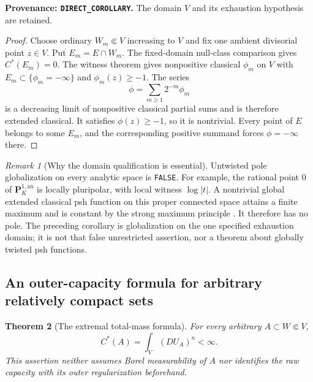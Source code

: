\documentclass[11pt,a4paper]{article}
\numberwithin{equation}{section}
\newtheorem{theorem}{Theorem}[section]
\theoremstyle{definition}
\theoremstyle{remark}
\newtheorem{remark}[theorem]{Remark}
\newcommand{\an}{\mathrm{an}}
\begin{document}
\noindent\textbf{Provenance: \texttt{DIRECT\_COROLLARY}.}
The domain $V$ and its exhaustion hypothesis are retained.

\begin{proof}
Choose ordinary $W_m\Subset V$ increasing to $V$ and fix one
ambient divisorial point $z\in V$. Put $E_m=E\cap W_m$.
The fixed-domain null-class comparison gives $C^*(E_m)=0$.
The witness theorem gives nonpositive classical $\phi_m$ on $V$
with $E_m\subset\{\phi_m=-\infty\}$ and $\phi_m(z)\geq-1$.
The series
\[
 \phi=\sum_{m\geq1}2^{-m}\phi_m
\]
is a decreasing limit of nonpositive classical partial sums and
is therefore extended classical. It satisfies $\phi(z)\geq-1$,
so it is nontrivial. Every point of $E$ belongs to some $E_m$,
and the corresponding positive summand forces $\phi=-\infty$
there.
\end{proof}

\begin{remark}[Why the domain qualification is essential]
Untwisted pole globalization on every analytic space is
\texttt{FALSE}. For example, the rational point $0$ of
$\mathbf P^{1,\an}_K$ is locally pluripolar, with local witness
$\log|t|$. A nontrivial global extended classical psh function
on this proper connected space attains a finite maximum and is
constant by the strong maximum principle
\cite[Theorem 6.1]{GR25}. It therefore has no
pole. The preceding corollary is globalization on the one
specified exhaustion domain; it is not that false unrestricted
assertion, nor a theorem about globally twisted psh functions.
\end{remark}

\subsection{An outer-capacity formula for arbitrary relatively compact sets}

\begin{theorem}[The extremal total-mass formula]
\label{thm:r2-arbitrary-extremal-mass}
For every arbitrary $A\subset W\Subset V$,
\[
 C^*(A)=\int_V(DU_A)^n<\infty.
\]
This assertion neither assumes Borel measurability of $A$ nor
identifies the raw capacity with its outer regularization beforehand.
\end{theorem}
\end{document}
